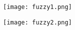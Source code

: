 
\begin{frame}
\begin{figure}
\texttt{[image: fuzzy1.png]}
\end{figure}
\begin{figure}
\texttt{[image: fuzzy2.png]}
\end{figure}
\end{frame}





